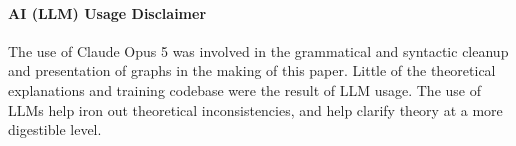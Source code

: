 \documentclass{article}
\theoremstyle{plain}
\theoremstyle{definition}
\theoremstyle{remark}
\begin{document}



\paragraph{AI (LLM) Usage Disclaimer} The use of Claude Opus 5 was involved in the grammatical and syntactic
cleanup and presentation of graphs in the making of this paper. Little of the theoretical explanations and
training codebase were the result of LLM usage. The use of LLMs help iron out theoretical inconsistencies,
and help clarify theory at a more digestible level. 
\end{document}
